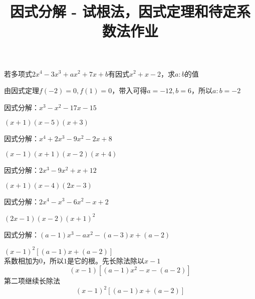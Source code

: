 \documentclass[windows,csize4]{BHCexam}
\title{因式分解 - 试根法，因式定理和待定系数法作业}
\begin{document}
\maketitle


\begin{groups}
    \begin{questions}[]

        \question[5] 若多项式$2x^4-3x^3+ax^2+7x+b$有因式$x^2+x-2$，求$a:b$的值
        \begin{solution}{0.5cm}
            \methodonly 由因式定理$f(-2)=0,f(1)=0$，带入可得$a=-12,b=6$，所以$a:b=-2$
        \end{solution}
        \vspace{3.5cm}

        \question[5] 因式分解：$x^3-x^2-17x-15$
        \begin{solution}{0.5cm}
            \methodonly $(x+1)(x-5)(x+3)$
        \end{solution}
        \vspace{3.5cm}

        \question[5] 因式分解：$x^4+2x^3-9x^2-2x+8$
        \begin{solution}{0.5cm}
            \methodonly $(x-1)(x+1)(x-2)(x+4)$
        \end{solution}
        \vspace{3.5cm}

        \question[5] 因式分解：$2x^3-9x^2+x+12$
        \begin{solution}{0.5cm}
            \methodonly $(x+1)(x-4)(2x-3)$
        \end{solution}
        \vspace{3.5cm}

        \question[5] 因式分解：$2x^4-x^3-6x^2-x+2$
        \begin{solution}{0.5cm}
            \methodonly $(2x-1)(x-2)(x+1)^2$
        \end{solution}
        \vspace{3.5cm}

        \question[5] 因式分解：$(a-1)x^3-ax^2-(a-3)x+(a-2)$
        \begin{solution}{0.5cm}
            \methodonly $(x-1)^2[(a-1)x+(a-2)]$ \\ 
            系数相加为$0$，所以$1$是它的根。先长除法除以$x-1$
            \[
                (x-1)[(a-1)x^2-x-(a-2)]
            \]
            第二项继续长除法 
            \[
                (x-1)^2[(a-1)x+(a-2)]
            \]
        \end{solution}
        \vspace{3.5cm}


\end{questions}
\end{groups}
\end{document}
